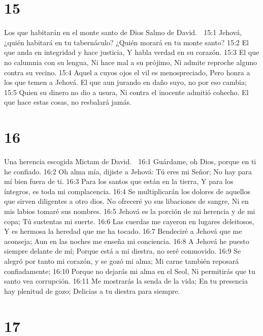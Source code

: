 \chapter{15}

Los que habitarán en el monte santo de Dios 
Salmo de David. 

15:1 Jehová, ¿quién habitará en tu tabernáculo? 
¿Quién morará en tu monte santo? 
15:2 El que anda en integridad y hace justicia, 
Y habla verdad en su corazón. 
15:3 El que no calumnia con su lengua, 
Ni hace mal a su prójimo, 
Ni admite reproche alguno contra su vecino. 
15:4 Aquel a cuyos ojos el vil es menospreciado, 
Pero honra a los que temen a Jehová. 
El que aun jurando en daño suyo, no por eso cambia; 
15:5 Quien su dinero no dio a usura, 
Ni contra el inocente admitió cohecho. 
El que hace estas cosas, no resbalará jamás. 

\chapter{16}

Una herencia escogida 
Mictam de David. 

16:1 Guárdame, oh Dios, porque en ti he confiado. 
16:2 Oh alma mía, dijiste a Jehová: 
Tú eres mi Señor; 
No hay para mí bien fuera de ti. 
16:3 Para los santos que están en la tierra, 
Y para los íntegros, es toda mi complacencia. 
16:4 Se multiplicarán los dolores de aquellos que sirven diligentes a otro dios. 
No ofreceré yo sus libaciones de sangre, 
Ni en mis labios tomaré sus nombres. 
16:5 Jehová es la porción de mi herencia y de mi copa; 
Tú sustentas mi suerte. 
16:6 Las cuerdas me cayeron en lugares deleitosos, 
Y es hermosa la heredad que me ha tocado. 
16:7 Bendeciré a Jehová que me aconseja; 
Aun en las noches me enseña mi conciencia. 
16:8 A Jehová he puesto siempre delante de mí; 
Porque está a mi diestra, no seré conmovido. 
16:9 Se alegró por tanto mi corazón, y se gozó mi alma; 
Mi carne también reposará confiadamente; 
16:10 Porque no dejarás mi alma en el Seol, 
Ni permitirás que tu santo vea corrupción. 
16:11 Me mostrarás la senda de la vida; 
En tu presencia hay plenitud de gozo; 
Delicias a tu diestra para siempre. 

\chapter{17}

